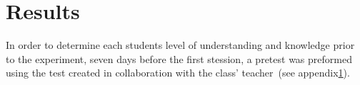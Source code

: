 \chapter{Results}
In order to determine each students level of understanding and knowledge prior to the experiment, seven days before the first stession, a pretest was preformed using the test created in collaboration with the class' teacher~(see appendix\ref{}).